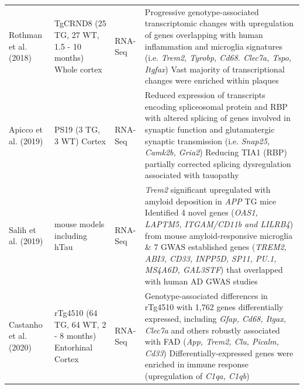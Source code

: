 \begin{changemargin}{1.5cm}
\begin{landscape}
\begin{longtable}[c]{p{3cm}p{4cm}p{3cm}p{16cm}}
			\centering Rothman et al. (2018)\cite{Rothman2018}&
			\centering TgCRND8 (25 TG, 27 WT, 1.5 - 10 months) \newline Whole cortex&
			\centering RNA-Seq &
			\tabitem Progressive genotype-associated transcriptomic changes with upregulation of genes overlapping with human inflammation and microglia signatures (i.e. \textit{Trem2, Tyrobp, Cd68. Clec7a, Tspo, Itgfax}) \newline
			\tabitem Vast majority of transcriptional changes were enriched within plaques  \\
			\hdashline[0.5pt/5pt]
			
			\centering Apicco et al. (2019) \cite{Apicco2019} &
			\centering PS19 (3 TG, 3 WT) \newline Cortex &
			\centering RNA-Seq &
			\tabitem Reduced expression of transcripts encoding spliceosomal protein and RBP with altered splicing of genes involved in synaptic function and glutamatergic synaptic transmission (i.e. \textit{Snap25, Camk2b, Gria2})
			\tabitem Reducing TIA1 (RBP) partially corrected splicing dysregulation associated with tauopathy \\
			\hdashline[0.5pt/5pt]
			
			\centering Salih et al. (2019) \cite{Salih2019} &
			\centering 5 mouse models including hTau   &
			\centering RNA-Seq &
			\tabitem \textit{Trem2} significant upregulated with amyloid deposition in \textit{APP} TG mice \newline
			\tabitem Identified 4 novel genes (\textit{OAS1, LAPTM5, ITGAM/CD11b and LILRB4}) from mouse amyloid-responsive microglia \& 7 GWAS established genes (\textit{TREM2, ABI3, CD33, INPP5D, SP11, PU.1, MS4A6D, GAL3STF}) that overlapped with human AD GWAS studies \\
			\hdashline[0.5pt/5pt]
			
			\centering Castanho et al. (2020) \cite{Castanho2020} &
			\centering rTg4510 (64 TG, 64 WT, 2 - 8 months) \newline Entorhinal Cortex &
			\centering RNA-Seq &
			\tabitem Genotype-associated differences in rTg4510 with 1,762 genes differentially expressed, including \textit{Gfap, Cd68, Itgax, Clec7a} and others robustly associated with FAD (\textit{App, Trem2, Clu, Picalm, Cd33})  
			\tabitem Differentially-expressed genes were enriched in immune response (upregulation of \textit{C1qa, C1qb})\\* \bottomrule
		\end{longtable}
	\end{landscape}
\end{changemargin}


